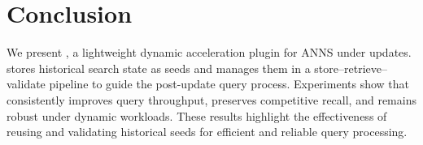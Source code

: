 \section{Conclusion}
We present \system, a lightweight dynamic acceleration plugin for ANNS under updates. 
\system stores historical search state as seeds and manages them in a store--retrieve--validate pipeline to guide the post-update query process. Experiments show that \system consistently improves query throughput, preserves competitive recall, and remains robust under dynamic workloads. These results highlight the effectiveness of reusing and validating historical seeds for efficient and reliable query processing.